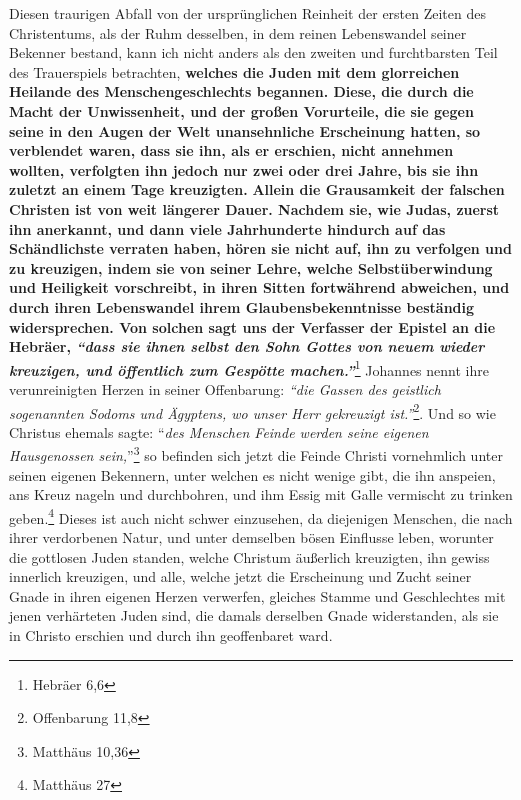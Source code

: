 Diesen traurigen Abfall von der ursprünglichen Reinheit der ersten Zeiten des
Christentums, als der Ruhm desselben, in dem reinen Lebenswandel seiner
Bekenner bestand, kann ich nicht anders als den zweiten und furchtbarsten Teil
des Trauerspiels betrachten,
\label{ref:01_04_zweite_kreuzigung}
\textbf{welches die Juden  mit dem
glorreichen Heilande des Menschengeschlechts begannen. Diese, die durch die
Macht der Unwissenheit, und der großen Vorurteile, die sie gegen seine in den
Augen der Welt unansehnliche Erscheinung hatten, so verblendet waren, dass sie
ihn, als er erschien, nicht annehmen wollten, verfolgten ihn jedoch nur zwei
oder drei Jahre, bis sie ihn zuletzt an einem Tage kreuzigten.}
\textbf{Allein die Grausamkeit der falschen Christen ist von weit längerer
Dauer. Nachdem sie, wie Judas, zuerst ihn anerkannt, und
dann viele Jahrhunderte hindurch auf das Schändlichste verraten haben, hören
sie nicht auf, ihn zu verfolgen und zu kreuzigen, indem sie von seiner Lehre,
welche Selbstüberwindung und Heiligkeit vorschreibt, in ihren Sitten fortwährend
abweichen, und durch ihren Lebenswandel ihrem Glaubensbekenntnisse beständig
widersprechen. Von solchen sagt uns der Verfasser der Epistel an die Hebräer,
\textit{"`dass sie ihnen selbst den Sohn Gottes von neuem wieder kreuzigen, und
öffentlich zum Gespötte machen."'}}\footnote{Hebräer 6,6}
Johannes nennt ihre verunreinigten Herzen in seiner Offenbarung:
\textit{"`die Gassen des geistlich sogenannten Sodoms und Ägyptens, wo unser Herr gekreuzigt ist."'}\footnote{Offenbarung 11,8}.
Und so wie Christus ehemals sagte: "`\textit{des
Menschen Feinde werden seine eigenen Hausgenossen sein,}"'\footnote{Matthäus 10,36}
so befinden sich jetzt die Feinde Christi vornehmlich unter seinen
eigenen Bekennern, unter welchen es nicht wenige gibt, die ihn anspeien, ans
Kreuz nageln und durchbohren, und ihm Essig mit Galle vermischt zu trinken
geben.\footnote{Matthäus 27}
Dieses ist auch nicht schwer einzusehen, da
diejenigen Menschen, die nach ihrer verdorbenen Natur, und unter demselben bösen
Einflusse leben, worunter die gottlosen Juden standen, welche Christum äußerlich
kreuzigten, ihn gewiss innerlich kreuzigen, und alle, welche jetzt die
Erscheinung und Zucht seiner Gnade in ihren eigenen Herzen verwerfen, gleiches
Stamme und Geschlechtes mit jenen verhärteten Juden sind, die damals derselben
Gnade widerstanden, als sie in Christo erschien und durch ihn geoffenbaret
ward.

